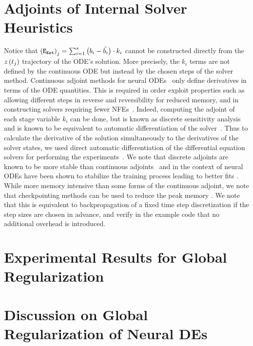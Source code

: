 \section{Adjoints of Internal Solver Heuristics}
\label{sec:adjoints_of_internal_solver_heuristics}

Notice that $\left(\texttt{E}_{\texttt{Est}}\right)_j = \sum_{i = 1}^s \left(b_i - \tilde{b_i}\right) \cdot k_i$ cannot be constructed directly from the $z\left(t_j\right)$ trajectory of the ODE's solution. More precisely, the $k_i$ terms are not defined by the continuous ODE but instead by the chosen steps of the solver method. Continuous adjoint methods for neural ODEs~\citep{chen2018neural, zhuang2021mali} only define derivatives in terms of the ODE quantities. This is required in order exploit properties such as allowing different steps in reverse and reversibility for reduced memory, and in constructing solvers requiring fewer NFEs~\citep{kidger2020hey}. Indeed, computing the adjoint of each stage variable $k_i$ can be done, but is known as discrete sensitivity analysis and is known to be equivalent to automatic differentiation of the solver~\citep{zhang2014fatode}. Thus to calculate the derivative of the solution simultaneously to the derivatives of the solver states, we used direct automatic differentiation of the differential equation solvers for performing the experiments~\citep{innes2018don}. We note that discrete adjoints are known to be more stable than continuous adjoints~\citep{zhang2014fatode} and in the context of neural ODEs have been shown to stabilize the training process leading to better fits \citep{gholami2019anode,onken2020discretize}. While more memory intensive than some forms of the continuous adjoint, we note that checkpointing methods can be used to reduce the peak memory \citep{dauvergne2006data}. We note that this is equivalent to backpropagation of a fixed time step discretization if the step sizes are chosen in advance, and verify in the example code that no additional overhead is introduced.


\section{Experimental Results for Global Regularization}
\label{sec:experimental_results_global_regularized_neural_des}


\section{Discussion on Global Regularization of Neural DEs}
\label{sec:discussion_on_global_regularization_of_neural_des}

